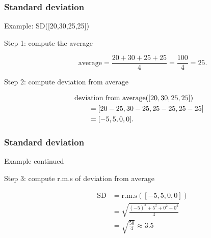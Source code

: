 \documentclass[handout]{beamer}
\begin{document}

   \begin{frame} \frametitle{Standard deviation}

   \begin{block}
   {Example: SD([20,30,25,25])}

   \begin{description}
   \item[Step 1: compute the average]
   $$\text{average} = \frac{20+30+25+25}{4} = \frac{100}{4} = 25.$$
   \item[Step 2: compute deviation from average]
   $$
   \begin{aligned}
   \lefteqn{\text{deviation from average}([20,30,25,25])} \\
   & \qquad = [20-25,30-25,25-25,25-25] \\
   & \qquad = [-5,5,0,0].
   \end{aligned}
   $$
   \end{description}
   \end{block}
   \end{frame}


   \begin{frame} \frametitle{Standard deviation}

   \begin{block}
   {Example continued}

   \begin{description}
   \item[Step 3: compute r.m.s of deviation from average]
   $$
   \begin{aligned}
   \text{SD} &= \text{r.m.s}([-5,5,0,0]) \\
   &= \sqrt{\frac{(-5)^2+5^2+0^2+0^2}{4}} \\
   &= \sqrt{\frac{50}{4}} \approx 3.5
   \end{aligned}
   $$
   \end{description}
   \end{block}
   \end{frame}

\end{document}

